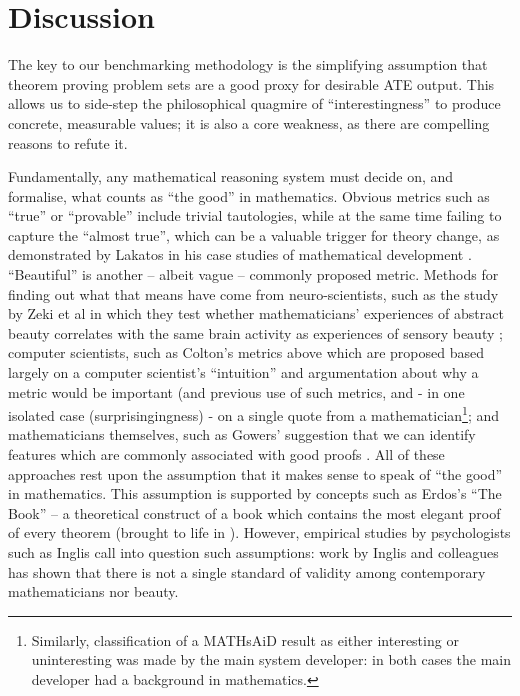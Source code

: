 
\section{Discussion}
\label{sec:discussion}

The key to our benchmarking methodology is the simplifying assumption that
theorem proving problem sets are a good proxy for desirable ATE output. This
allows us to side-step the philosophical quagmire of ``interestingness'' to
produce concrete, measurable values; it is also a core weakness, as there are
compelling reasons to refute it.

Fundamentally, any mathematical reasoning system must decide on, and formalise,
what counts as ``the good'' in mathematics.  Obvious metrics such as ``true'' or
``provable'' include trivial tautologies, while at the same time failing to
capture the ``almost true'', which can be a valuable trigger for theory change,
as demonstrated by Lakatos in his case studies of mathematical development
\cite{lakatos}. ``Beautiful'' is another -- albeit vague -- commonly proposed
metric. Methods for finding out what that means have come from neuro-scientists,
such as the study by Zeki et al in which they test whether mathematicians'
experiences of abstract beauty correlates with the same brain activity as
experiences of sensory beauty \cite{zeki}; computer scientists, such as Colton's
metrics above which are proposed based largely on a computer scientist's
``intuition'' and argumentation about why a metric would be important (and
previous use of such metrics, and - in one isolated case (surprisingingness) -
on a single quote from a mathematician\footnote{Similarly, classification of a
MATHsAiD result as either interesting or uninteresting \cite{roy} was made by
the main system developer: in both cases the main developer had a background in
mathematics.}; and mathematicians themselves, such as Gowers' suggestion that we
can identify features which are commonly associated with good proofs
\cite{gowers}. All of these approaches rest upon the assumption that it makes
sense to speak of ``the good'' in mathematics. This assumption is supported by
concepts such as Erdos's ``The Book'' -- a theoretical construct of a book which
contains the most elegant proof of every theorem (brought to life in
\cite{aigner2010proofs}). However,
empirical studies by psychologists such as Inglis call into question such
assumptions: work by Inglis and colleagues has shown that there is not a single
standard of validity among contemporary mathematicians %
nor beauty. %

